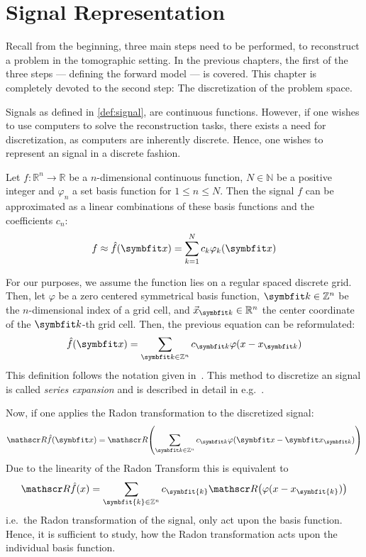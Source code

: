 \chapter{Signal Representation}\label{chap:signal_representation}

Recall from the beginning, three main steps need to be performed, to reconstruct a problem in the
tomographic setting. In the previous chapters, the first of the three steps --- defining the forward
model --- is covered. This chapter is completely devoted to the second step: The discretization of
the problem space.

Signals as defined in \autoref{def:signal}, are continuous functions. However, if one wishes to use
computers to solve the reconstruction tasks, there exists a need for discretization, as computers
are inherently discrete. Hence, one wishes to represent an signal in a discrete fashion.

\begin{definition}
	\label{def:permissible_representation}
	Let \(f\colon \mathbb{R}^n \to \mathbb{R}\) be a \(n\)-dimensional continuous function,
	\(N \in \mathbb{N}\) be a positive integer and \(\varphi_n\) a set basis function for
	\(1 \leq n \leq N\). Then the signal \(f\) can be approximated as a linear combinations
	of these basis functions and the coefficients \(c_n\):
	\[ f \approx \near{f}(\mvec{x}) = \sum_{k=1}^{N} c_k \varphi_k(\mvec{x}) \]
\end{definition}


For our purposes, we assume the function lies on a regular spaced discrete grid. Then, let
\(\varphi\) be a zero centered symmetrical basis function, \(\mvec{k} \in \mathbb{Z}^n\) be the
\(n\)-dimensional index of a grid cell, and \(\vec{x}_{\mvec{k}} \in \mathbb{R}^n\) the center
coordinate of the \(\mvec{k}\)-th grid cell. Then, the previous equation can be reformulated:
\[ \near{f}(\mvec{x}) = \sum_{\mvec{k} \in \mathbb{Z}^n} c_{\mvec{k}} \varphi(x - x_{\mvec{k}}) \]
This definition follows the notation given in~\cite{momey_new_2011}. This method to discretize an
signal is called \textit{series expansion} and is described in detail in
e.g.\ \cite{herman_basis_2015}.

Now, if one applies the Radon transformation to the discretized signal: 
\[ \radon\near{f}(\mvec{x}) = \radon\left( \sum_{\mvec{k} \in \mathbb{Z}^n} c_{\mvec{k}} \varphi(\mvec{x} - \mvec{x}_{\mvec{k}}) \right) \]
Due to the linearity of the Radon Transform this is equivalent to
\[ \radon\hat{f}(x) = \sum_{\symbfit{k} \in \mathbb{Z}^n} c_{\symbfit{k}}\radon\left( \varphi(x - x_{\symbfit{k}}) \right) \]
i.e.\ the Radon transformation of the signal, only act upon the basis function. Hence, it is
sufficient to study, how the Radon transformation acts upon the individual basis function.

